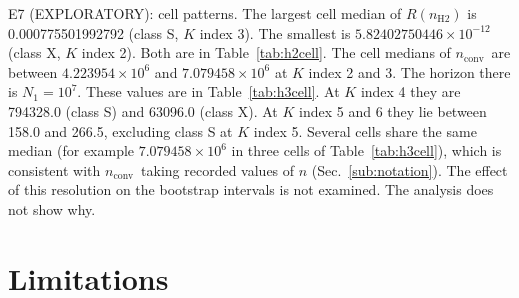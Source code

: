 \documentclass[aip,cha,reprint,amsmath,amssymb,longbibliography]{revtex4-2}
\newcommand{\sci}[2]{\ensuremath{#1\times10^{#2}}}
\newcommand{\tenp}[1]{\ensuremath{10^{#1}}}
\newcommand{\nH}{\ensuremath{n_{\mathrm{H2}}}}
\newcommand{\nconv}{\ensuremath{n_{\mathrm{conv}}}}
\newcommand{\Sec}[1]{Sec.~\ref{#1}}
\begin{document}
E7 (EXPLORATORY): cell patterns.
The largest cell median of $R(\nH)$ is 0.000775501992792 (class S, $K$ index 3).
The smallest is \sci{5.82402750446}{-12} (class X, $K$ index 2).
Both are in Table~\ref{tab:h2cell}.
The cell medians of \nconv\ are between \sci{4.223954}{6} and \sci{7.079458}{6} at $K$ index 2 and 3.
The horizon there is $N_1=$\tenp{7}.
These values are in Table~\ref{tab:h3cell}.
At $K$ index 4 they are 794328.0 (class S) and 63096.0 (class X).
At $K$ index 5 and 6 they lie between 158.0 and 266.5, excluding class S at $K$ index 5.
Several cells share the same median (for example \sci{7.079458}{6} in three cells of Table~\ref{tab:h3cell}), which is consistent with \nconv\ taking recorded values of $n$ (\Sec{sub:notation}).
The effect of this resolution on the bootstrap intervals is not examined.
The analysis does not show why.

\section{Limitations}
\label{sec:lim}
\end{document}
